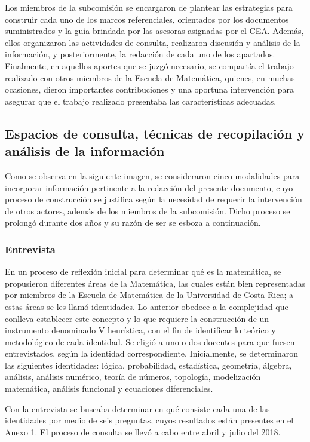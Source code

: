 Los miembros de la subcomisión se encargaron de plantear las estrategias para construir cada uno de los marcos referenciales, orientados por los documentos suministrados y la guía brindada por las asesoras asignadas por el CEA. Además, ellos organizaron las actividades de consulta, realizaron discusión y análisis de la información, y posteriormente, la redacción de cada uno de los apartados. Finalmente, en aquellos aportes que se juzgó necesario, se compartía el trabajo realizado con otros miembros de la Escuela de Matemática, quienes, en muchas ocasiones, dieron importantes contribuciones y una oportuna intervención para asegurar que el trabajo realizado presentaba las características adecuadas. 

\subsection{Espacios de consulta, técnicas de recopilación y análisis de la información}

Como se observa en la siguiente imagen, se consideraron cinco modalidades para incorporar información pertinente a la redacción del presente documento, cuyo proceso de construcción se justifica según la necesidad de requerir la intervención de otros actores, además de los miembros de la subcomisión. Dicho proceso se prolongó durante dos años y su razón de ser se esboza a continuación. 

\subsubsection{Entrevista}

En un proceso de reflexión inicial para determinar qué es la matemática, se propusieron diferentes áreas de la Matemática, las cuales están bien representadas por miembros de la Escuela de Matemática de la Universidad de Costa Rica; a estas áreas se les llamó identidades. Lo anterior obedece a la complejidad que conlleva establecer este concepto y lo que requiere la construcción de un instrumento denominado V heurística, con el fin de identificar lo teórico y metodológico de cada identidad. Se eligió a uno o dos docentes para que fuesen entrevistados, según la identidad correspondiente. Inicialmente, se determinaron las siguientes identidades: lógica, probabilidad, estadística, geometría, álgebra, análisis, análisis numérico, teoría de números, topología, modelización matemática, análisis funcional y ecuaciones diferenciales.

Con la entrevista se buscaba determinar en qué consiste cada una de las identidades por medio de seis preguntas, cuyos resultados están presentes en el Anexo 1. El proceso de consulta se llevó a cabo entre abril y julio del 2018.

